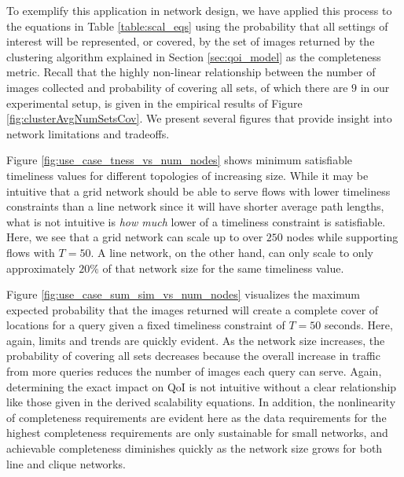 To exemplify this application in network design, we have applied this process to the equations in Table \ref{table:scal_eqs} using the probability that all settings of interest will be represented, or covered, by the set of images returned by the clustering algorithm explained in Section \ref{sec:qoi_model} as the completeness metric.  Recall that the highly non-linear relationship between the number of images collected and probability of covering all sets, of which there are $9$ in our experimental setup, is given in the empirical results of Figure \ref{fig:clusterAvgNumSetsCov}.  We present several figures that provide insight into network limitations and tradeoffs. 

Figure \ref{fig:use_case_tness_vs_num_nodes} shows minimum satisfiable timeliness values for different topologies of increasing size.  While it may be intuitive that a grid network should be able to serve flows with lower timeliness constraints than a line network since it will have shorter average path lengths, what is not intuitive is \emph{how much} lower of a timeliness constraint is satisfiable.  Here, we see that a grid network can scale up to over $250$ nodes while supporting flows with $T = 50$.  A line network, on the other hand, can only scale to only approximately $20\%$ of that network size for the same timeliness value.  

Figure \ref{fig:use_case_sum_sim_vs_num_nodes} visualizes the maximum expected probability that the images returned will create a complete cover of locations for a query given a fixed timeliness constraint of $T=50$ seconds. Here, again, limits and trends are quickly evident.  As the network size increases, the probability of covering all sets decreases because the overall increase in traffic from more queries reduces the number of images each query can serve. Again, determining the exact impact on QoI is not intuitive without a clear relationship like those given in the derived scalability equations.  In addition, the nonlinearity of completeness requirements are evident here as the data requirements for the highest completeness requirements are only sustainable for small networks, and achievable completeness diminishes quickly as the network size grows for both line and clique networks. 

